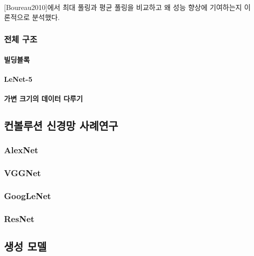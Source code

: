 \documentclass [12pt] {oblivoir}
\let\oldsubsubsection=\subsubsection
\renewcommand{\subsubsection}
{
  \filbreak
  \oldsubsubsection
}
\begin{document}
[Boureau2010]에서 최대 풀링과 평균 풀링을 비교하고 왜 성능 향상에 기여하는지 이론적으로 분석했다.

\subsubsection{전체 구조}

\paragraph*{빌딩블록}\mbox{}

\vspace{3mm}

\paragraph*{LeNet-5}\mbox{}

\vspace{3mm}

\paragraph*{가변 크기의 데이터 다루기}\mbox{}

\vspace{3mm}

\subsection{컨볼루션 신경망 사례연구}

\subsubsection{AlexNet}

\subsubsection{VGGNet}

\subsubsection{GoogLeNet}

\subsubsection{ResNet}

\subsection{생성 모델}
\end{document}

